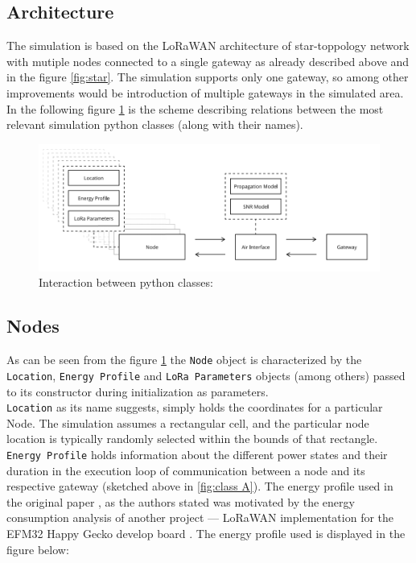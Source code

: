\subsection{Architecture}

The simulation is based on the LoRaWAN architecture of star-toppology network with mutiple nodes connected to a single gateway as already described above and in the figure \ref{fig:star}. The simulation supports only one gateway, so among other improvements would be introduction of multiple gateways in the simulated area. \\

In the following figure \ref{fig:architecture} is the scheme describing relations between the most relevant simulation python classes (along with their names).

\begin{figure}[h!]
  \centering
  \includegraphics[scale=0.5]{figures/architecture.PNG}
  \caption{Interaction between python classes: \cite{simulator}}
  \label{fig:architecture}
\end{figure}

\subsection{Nodes}

As can be seen from the figure \ref{fig:architecture} the \texttt{Node} object is characterized by the \texttt{Location}, \texttt{Energy Profile} and \texttt{LoRa Parameters} objects (among others) passed to its constructor during initialization as parameters.\\

\texttt{Location} as its name suggests, simply holds the coordinates for a particular Node. The simulation assumes a rectangular cell, and the particular node location is typically randomly selected within the bounds of that rectangle. \\

\texttt{Energy Profile} holds information about the different power states and their duration in the execution loop of communication between a node and its respective gateway (sketched above in \ref{fig:class A}). The energy profile used in the original paper \cite{simulator}, as the authors stated was motivated by the energy consumption analysis of another project — LoRaWAN implementation for the EFM32 Happy Gecko develop board \cite{energy_profile}. The energy profile used is displayed in the figure below:

